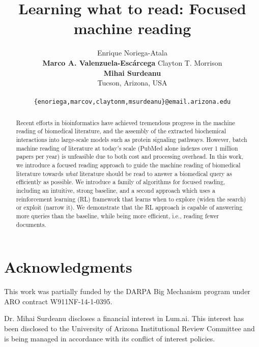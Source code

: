 \documentclass[11pt,letterpaper]{article}
\title{Learning what to read: Focused machine reading}  %
\author{Enrique Noriega-Atala \\ {\bf Marco A. Valenzuela-Esc\'{a}rcega}  \And Clayton T. Morrison \\  {\bf Mihai Surdeanu} \AND {\normalfont University of Arizona}\\ Tucson, Arizona, USA \\ \\ {\tt \{enoriega,marcov,claytonm,msurdeanu\}@email.arizona.edu} }
\date{}
\begin{document}
\maketitle

\begin{abstract}
Recent efforts in bioinformatics have achieved tremendous progress in the machine reading of biomedical literature, and the assembly of the extracted biochemical interactions into large-scale models such as protein signaling pathways. 
However, batch machine reading of literature at today's scale (PubMed alone indexes over 1 million papers per year) is unfeasible due to both cost and processing overhead. In this work,
we introduce a focused reading approach to guide the machine reading of biomedical literature towards {\em what} literature should be read to answer a biomedical query as efficiently as possible. We introduce a family of algorithms for focused reading, including an intuitive, strong baseline, and a second approach which uses a reinforcement learning (RL) framework that learns when to explore (widen the search) or exploit (narrow it). 
We demonstrate that the RL approach is capable of answering more queries than the  baseline, while being more efficient, i.e., reading fewer documents.


\end{abstract}








\section*{Acknowledgments}

This work was partially funded by the DARPA Big Mechanism
program under ARO contract W911NF-14-1-0395.

Dr. Mihai Surdeanu discloses a financial interest in Lum.ai. This interest has been disclosed to the University of Arizona Institutional Review Committee and is being managed in accordance with its conflict of interest policies.




\end{document}
